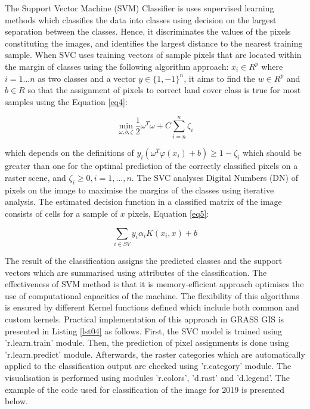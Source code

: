 \documentclass[jmse,article,submit,pdftex,moreauthors]{Definitions/mdpi}
\begin{document}
The Support Vector Machine (SVM) Classifier is uses supervised learning methods \cite{Cortes} which classifies the data into classes using decision on the largest separation between the classes. Hence, it discriminates the values of the pixels constituting the images, and identifies the largest distance to the nearest training sample. When SVC uses training vectors of sample pixels that are located within the margin of classes using the following algorithm approach:
$x_{i} \in R^p$ where $ i=1 \dots n$ as two classes and a vector $y \in \{1, - 1\}^n$, it aims to find the $w \in R^p$ and $b \in R$ so that the assignment of pixels to correct land cover class is true for most samples using the Equation \ref{eq4}:

\begin{equation}
\min_{\omega,b,\zeta}\frac{1}{2}\omega^T\omega+C\sum_{i=n}^{n}\zeta_{i}
\label{eq4}
\end{equation}

which depends on the definitions of $y_{i}(\omega^{T}\varphi (x_i) + b)\geq 1-\zeta_{i}$ which should be greater than one for the optimal prediction of the correctly classified pixels on a raster scene, and $\zeta_{i}\geq 0, i = 1,\dots,n$. The SVC analyses Digital Numbers (DN) of pixels on the image to maximise the margins of the classes using iterative analysis. The estimated decision function in a classified matrix of the image consists of cells for a sample of $x$ pixels, Equation \ref{eq5}:

\begin{equation}
\sum_{i\in SV}y_{i}\alpha_{i}K(x_{i},x) + b
\label{eq5}
\end{equation}

The result of the classification assigns the predicted classes and the support vectors which are summarised using attributes of the classification. The effectiveness of SVM method is that it is memory-efficient approach optimises the use of computational capacities of the machine. The flexibility of this algorithms is ensured by different Kernel functions defined which include both common and custom kernels. Practical implementation of this approach in GRASS GIS is presented in Listing \ref{lst04} as follows. First, the SVC model is trained using 'r.learn.train' module. Then, the prediction of pixel assignments is done using 'r.learn.predict' module. Afterwards, the raster categories which are automatically applied to the classification output are checked using 'r.category' module. The visualisation is performed using modules 'r.colors', 'd.rast' and 'd.legend'. The example of the code used for classification of the image for 2019 is presented below. 
\end{document}
